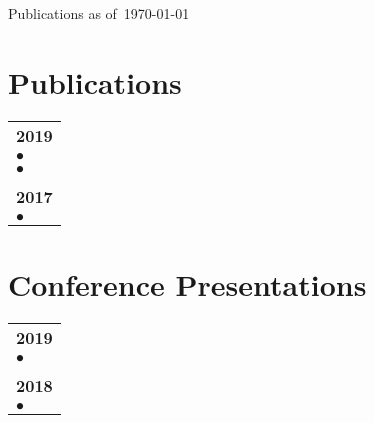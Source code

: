 \documentclass{article}
\def\Title{Publications en date du}
\def\Orals{Pr\'esentations en Conf\'erence}
\def\Title{Publications as of}
\def\Orals{Conference Presentations}
\newcommand{\docite}[1]{$\bullet$ \fullcite{#1}}
\begin{document}
\begingroup
 \centering 
 \vspace*{\baselineskip} 
 {\LARGE \Title\ \today}
 \vspace*{1\baselineskip}
\endgroup

\renewcommand{\arraystretch}{1.2}
\setlength{\tabcolsep}{0pt}
\section{Publications}
\begin{tabular}{m{}}
 \\\textbf{2019} \\
 \docite{GodinDubois2019b} \\
 \docite{GodinDubois2019a} \\

 \\\textbf{2017} \\
 \docite{Dubois2017}
\end{tabular}

\section{\Orals}

\begin{tabular}{m{}}
 \\\textbf{2019} \\
 \docite{GodinDubois2019c} \\

 \\\textbf{2018} \\
 \docite{GodinDubois2018}
\end{tabular}
\end{document}
